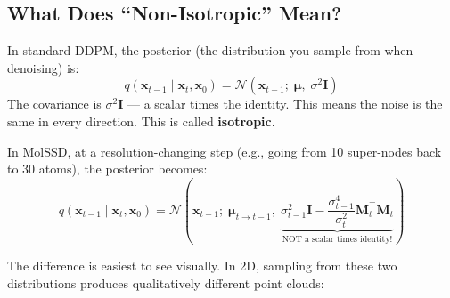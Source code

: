 \documentclass[12pt,a4paper]{article}
\newcommand{\cN}{\mathcal{N}}
\begin{document}
\vspace{0.5em}

\subsection{What Does ``Non-Isotropic'' Mean?}

In standard DDPM, the posterior (the distribution you sample from when denoising) is:
\[
q(\bm{x}_{t-1} \mid \bm{x}_t, \bm{x}_0) = \cN(\bm{x}_{t-1};\; \bm{\mu},\; \sigma^2 \bm{I})
\]
The covariance is $\sigma^2 \bm{I}$ --- a scalar times the identity. This means the noise is the same in every direction. This is called \textbf{isotropic}.

In MolSSD, at a resolution-changing step (e.g., going from 10 super-nodes back to 30 atoms), the posterior becomes:
\[
q(\bm{x}_{t-1} \mid \bm{x}_t, \bm{x}_0) = \cN\!\left(\bm{x}_{t-1};\; \bm{\mu}_{t \to t-1},\; \underbrace{\sigma_{t-1}^2 \bm{I} - \frac{\sigma_{t-1}^4}{\sigma_t^2} \bm{M}_t^\top \bm{M}_t}_{\text{NOT a scalar times identity!}}\right)
\]

The difference is easiest to see visually. In 2D, sampling from these two distributions produces qualitatively different point clouds:
\end{document}
